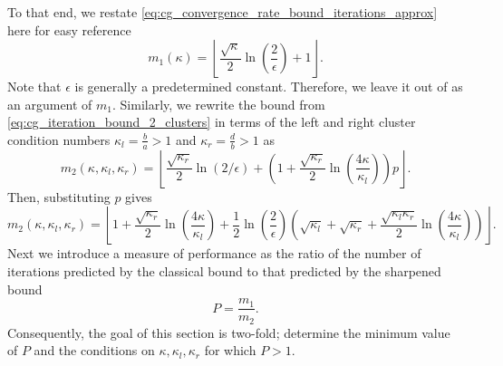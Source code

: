 To that end, we restate \cref{eq:cg_convergence_rate_bound_iterations_approx} here for easy reference
\[
    m_1(\kappa) = \left\lfloor\frac{\sqrt{\kappa}}{2}\ln\left(\frac{2}{\epsilon}\right) + 1\right\rfloor.
\]
Note that $\epsilon$ is generally a predetermined constant. Therefore, we leave it out of as an argument of $m_1$. Similarly, we rewrite the bound from \cref{eq:cg_iteration_bound_2_clusters} in terms of the left and right cluster condition numbers $\kappa_l = \frac{b}{a} > 1$ and $\kappa_r = \frac{d}{b} > 1$ as
\[
    m_2(\kappa, \kappa_l, \kappa_r)=\left\lfloor\frac{\sqrt{\kappa_r}}{2} \ln (2 / \epsilon)+\left(1+\frac{\sqrt{\kappa_r}}{2} \ln \left(\frac{4\kappa}{\kappa_l}\right)\right) p\right\rfloor.
\]
Then, substituting $p$ gives
\begin{equation}
    m_2(\kappa, \kappa_l, \kappa_r)=\left\lfloor
    1
    + \frac{\sqrt{\kappa_r}}{2}\ln\left(\frac{4\kappa}{\kappa_l}\right)
    + \frac{1}{2}\ln\left(\frac{2}{\epsilon}\right)\left(
    \sqrt{\kappa_l}
    + \sqrt{\kappa_r}
    + \frac{\sqrt{\kappa_l\kappa_r}}{2}\ln\left(\frac{4\kappa}{\kappa_l}\right)
    \right)
    \right\rfloor.
    \label{eq:cg_iteration_bound_2_clusters_condition_numbers}
\end{equation}
Next we introduce a measure of performance as the ratio of the number of iterations predicted by the classical bound to that predicted by the sharpened bound
\begin{equation}
    P = \frac{m_1}{m_2}.
    \label{eq:performance_ratio}
\end{equation}
Consequently, the goal of this section is two-fold; determine the minimum value of $P$ and the conditions on $\kappa,\kappa_l,\kappa_r$ for which $P > 1$.


